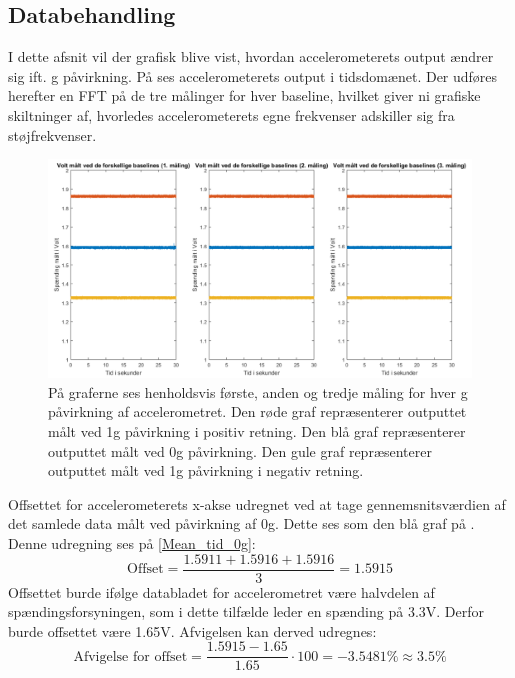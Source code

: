\subsection{Databehandling}
I dette afsnit vil der grafisk blive vist, hvordan accelerometerets output ændrer sig ift. g påvirkning. På  ses accelerometerets output i tidsdomænet. Der udføres herefter en FFT på de tre målinger for hver baseline, hvilket giver ni grafiske skiltninger af, hvorledes accelerometerets egne frekvenser adskiller sig fra støjfrekvenser.

\begin{figure}[H]
	\centering
	\includegraphics[scale=0.45]{figures/cProblemloesning/Pilotforsoeg_Tid.png}
	\caption{På graferne ses henholdsvis første, anden og tredje måling for hver g påvirkning af accelerometret. Den røde graf repræsenterer outputtet målt ved 1g påvirkning i positiv retning. Den blå graf repræsenterer outputtet målt ved 0g påvirkning. Den gule graf repræsenterer outputtet målt ved 1g påvirkning i negativ retning.}
	\label{Fig:Pilot_Tid}
\end{figure}

Offsettet for accelerometerets x-akse udregnet ved at tage gennemsnitsværdien af det samlede data målt ved påvirkning af 0g. Dette ses som den blå graf på . Denne udregning ses på \ref{Mean_tid_0g}:
\begin{equation}\label{Mean_tid_0g}
\text{Offset} = \frac{1.5911 + 1.5916 + 1.5916}{3} = 1.5915
\end{equation}
\noindent Offsettet burde ifølge databladet for accelerometret være halvdelen af spændingsforsyningen, som i dette tilfælde leder en spænding på 3.3V. \cite{Devices2009} Derfor burde offsettet være 1.65V. Afvigelsen kan derved udregnes:
\begin{equation}
\text{Afvigelse for offset} = \dfrac{1.5915 - 1.65}{1.65} \cdot 100 = -3.5481\% \approx 3.5\%
\end{equation}

